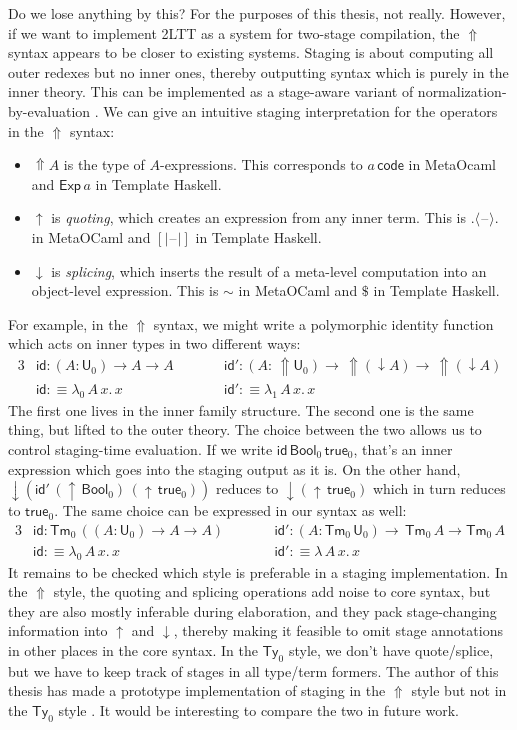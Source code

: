 \documentclass[12pt,a4paper,twoside,openany]{book}
\theoremstyle{remark}
\theoremstyle{definition}
\theoremstyle{theorem}
\newcommand{\ms}[1]{\mathsf{#1}}
\newcommand{\id}{\mathsf{id}}
\newcommand{\Tm}{\mathsf{Tm}}
\newcommand{\Ty}{\mathsf{Ty}}
\newcommand{\U}{\mathsf{U}}
\newcommand{\blank}{\mathord{\hspace{1pt}\text{--}\hspace{1pt}}}
\newcommand{\Lift}{\Uparrow}
\newcommand{\Bool}{\ms{Bool}}
\newcommand{\true}{\ms{true}}
\newcommand{\up}{\uparrow}
\newcommand{\down}{\downarrow}
\newcommand{\lab}{\langle}
\newcommand{\rab}{\rangle}
\newcommand{\defn}{:\equiv}
\begin{document}
Do we lose anything by this? For the purposes of this thesis, not
really. However, if we want to implement 2LTT as a system for two-stage
compilation, the $\Lift$ syntax appears to be closer to existing systems.
Staging is about computing all outer redexes but no inner ones, thereby
outputting syntax which is purely in the inner theory. This can be implemented
as a stage-aware variant of normalization-by-evaluation \cite{TODO}. We can give
an intuitive staging interpretation for the operators in the $\Lift$ syntax:
\begin{itemize}
\item
  $\Lift\!A$ is the type of $A$-expressions. This corresponds to $a\,\ms{code}$
  in MetaOcaml \cite{TODO} and $\ms{Exp}\,a$ in Template Haskell.
\item
  $\up$ is \emph{quoting}, which creates an expression from any inner term. This is
  $.\lab\blank\rab.$ in MetaOCaml and $[|\blank|]$ in Template Haskell.
\item $\down$ is \emph{splicing}, which inserts the result of a meta-level computation into
  an object-level expression. This is $\sim$ in MetaOCaml and $\$$ in Template Haskell.
\end{itemize}
For example, in the $\Lift$ syntax, we might write a polymorphic identity function
which acts on inner types in two different ways:
\begin{alignat*}{3}
  &\id : (A : \U_0) \to A \to A\hspace{2em} && \id' : (A :\,\Lift\!\U_0) \to\,\Lift\!(\down A) \to\,\Lift\!(\down A)\\
  &\id \defn \lambda_0\,A\,x.\,x && \id' \defn \lambda_1\,A\,x.\,x
\end{alignat*}
The first one lives in the inner family structure. The second one is the same
thing, but lifted to the outer theory. The choice between the two allows us to
control staging-time evaluation. If we write $\id\,\Bool_0\,\true_0$, that's an
inner expression which goes into the staging output as it is. On the other hand,
$\down(\id'\,(\up\,\Bool_0)\,(\up\,\true_0))$ reduces to $\down(\up\,\true_0)$
which in turn reduces to $\true_0$. The same choice can be expressed in our
syntax as well:
\begin{alignat*}{3}
  &\id : \Tm_0\,((A : \U_0) \to A \to A)\hspace{2em}&&\id' : (A : \Tm_0\,\U_0) \to\,\Tm_0\,A \to \Tm_0\,A\\
  &\id \defn \lambda_0\,A\,x.\,x &&\id' \defn \lambda\,A\,x.\,x
\end{alignat*}
It remains to be checked which style is preferable in a staging
implementation. In the $\Lift$ style, the quoting and splicing operations add
noise to core syntax, but they are also mostly inferable during elaboration, and
they pack stage-changing information into $\up$ and $\down$, thereby making it
feasible to omit stage annotations in other places in the core syntax. In the
$\Ty_0$ style, we don't have quote/splice, but we have to keep track of stages
in all type/term formers. The author of this thesis has made a prototype
implementation of staging in the $\Lift$ style but not in the $\Ty_0$ style
\cite{TODO}. It would be interesting to compare the two in future work.
\end{document}
